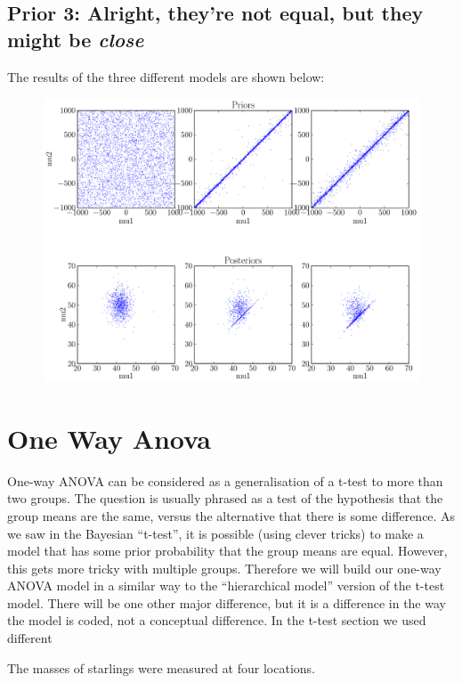 \subsection{Prior 3: Alright, they're not equal, but they might be {\it close}}

The results of the three different models are shown below:
\begin{figure}
\begin{center}
\includegraphics[scale=0.6]{Figures/ttest.pdf}
\end{center}
\end{figure}


\section{One Way Anova}
One-way ANOVA can be considered as a generalisation of a t-test to more than
two groups. The question is usually phrased as a test of the hypothesis that
the group means are the same, versus the alternative that there is some difference.
As we saw in the Bayesian ``t-test'', it is possible (using clever tricks) to
make a model that has some prior probability that the group means are equal.
However, this gets more tricky with multiple groups. Therefore we will build our
one-way ANOVA model in a similar way to the ``hierarchical model'' version of the
t-test model. There will be one other major difference, but it is a difference
in the way the model is coded, not a conceptual difference. In the t-test
section we used different 

The masses of starlings were measured at four locations.

